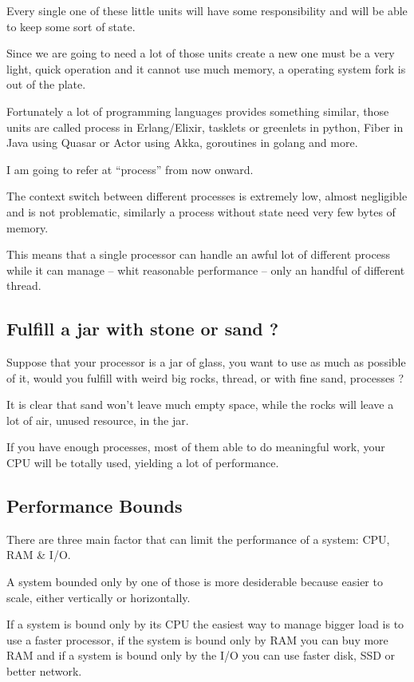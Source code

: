 \documentclass[12pt]{article} %
\begin{document}
Every single one of these little units will have some responsibility and will be able to keep some sort of state.

Since we are going to need a lot of those units create a new one must be a very light, quick operation and it cannot use much memory, a operating system fork is out of the plate.

Fortunately a lot of programming languages provides something similar, those units are called process in Erlang/Elixir, tasklets or greenlets in python, Fiber in Java using Quasar or Actor using Akka, goroutines in golang and more.

I am going to refer at ``process'' from now onward.

The context switch between different processes is extremely low, almost negligible and is not problematic, similarly a process without state need very few bytes of memory.

This means that a single processor can handle an awful lot of different process while it can manage -- whit reasonable performance -- only an handful of different thread.

	\subsection{Fulfill a jar with stone or sand ?}
	
Suppose that your processor is a jar of glass, you want to use as much as possible of it, would you fulfill with weird big rocks, thread, or with fine sand, processes ?

It is clear that sand won't leave much empty space, while the rocks will leave a lot of air, unused resource, in the jar.

If you have enough processes, most of them able to do meaningful work, your CPU will be totally used, yielding a lot of performance.
	
	\subsection{Performance Bounds}

There are three main factor that can limit the performance of a system: CPU, RAM \& I/O.

A system bounded only by one of those is more desiderable because easier to scale, either vertically or horizontally.

If a system is bound only by its CPU the easiest way to manage bigger load is to use a faster processor, if the system is bound only by RAM you can buy more RAM and if a system is bound only by the I/O you can use faster disk, SSD or better network.
\end{document}
